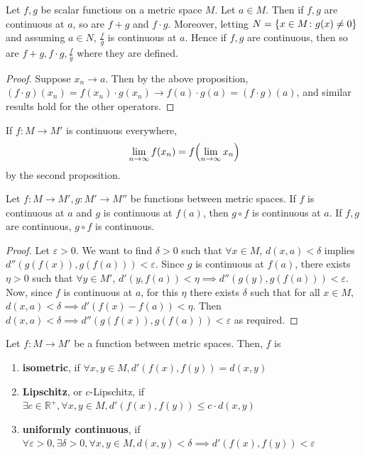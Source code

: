 \documentclass[a4paper,11pt]{article}
\begin{document}
\begin{proposition}
	Let \( f,g \) be scalar functions on a metric space \( M \).
	Let \( a \in M \).
	Then if \( f,g \) are continuous at \( a \), so are \( f+g \) and \( f \cdot g \).
	Moreover, letting \( N = \qty{x \in M \colon g(x) \neq 0} \) and assuming \( a \in N \), \( \frac{f}{g} \) is continuous at \( a \).
	Hence if \( f,g \) are continuous, then so are \( f+g, f \cdot g, \frac{f}{g} \) where they are defined.
\end{proposition}
\begin{proof}
	Suppose \( x_n \to a \).
	Then by the above proposition, \( (f\cdot g)(x_n) = f(x_n) \cdot g(x_n) \to f(a) \cdot g(a) = (f \cdot g)(a) \), and similar results hold for the other operators.
\end{proof}
\begin{remark}
	If \( f \colon M \to M' \) is continuous everywhere,
	\[
		\lim_{n \to \infty} f(x_n) = f\qty(\lim_{n \to \infty} x_n)
	\]
	by the second proposition.
\end{remark}
\begin{proposition}
	Let \( f \colon M \to M', g \colon M' \to M'' \) be functions between metric spaces.
	If \( f \) is continuous at \( a \) and \( g \) is continuous at \( f(a) \), then \( g \circ f \) is continuous at \( a \).
	If \( f,g \) are continuous, \( g \circ f \) is continuous.
\end{proposition}
\begin{proof}
	Let \( \varepsilon > 0 \).
	We want to find \( \delta > 0 \) such that \( \forall x \in M \), \( d(x,a) < \delta \) implies \( d''(g(f(x)), g(f(a))) < \varepsilon \).
	Since \( g \) is continuous at \( f(a) \), there exists \( \eta > 0 \) such that \( \forall y \in M' \), \( d'(y,f(a)) < \eta \implies d''(g(y), g(f(a))) < \varepsilon \).
	Now, since \( f \) is continuous at \( a \), for this \( \eta \) there exists \( \delta \) such that for all \( x \in M \), \( d(x,a) < \delta \implies d'(f(x) - f(a)) < \eta \).
	Then \( d(x,a) < \delta \implies d''(g(f(x)), g(f(a))) < \varepsilon \) as required.
\end{proof}

\begin{definition}
	Let \( f \colon M \to M' \) be a function between metric spaces.
	Then, \( f \) is
	\begin{enumerate}
		\item \textbf{isometric}, if \( \forall x,y \in M, d'(f(x),f(y)) = d(x,y) \)
		\item \textbf{Lipschitz}, or \( c \)-Lipschitz, if \( \exists c \in \mathbb R^+, \forall x,y \in M, d'(f(x),f(y)) \leq c\cdot d(x,y) \)
		\item \textbf{uniformly continuous}, if \( \forall \varepsilon > 0, \exists \delta > 0, \forall x,y \in M, d(x,y) < \delta \implies d'(f(x), f(y)) < \varepsilon \)
	\end{enumerate}
\end{definition}
\end{document}
